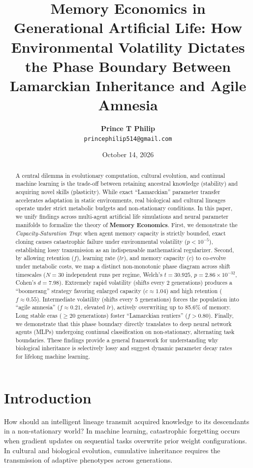 \documentclass[11pt,a4paper]{article}
\title{\textbf{Memory Economics in Generational Artificial Life: How Environmental Volatility Dictates the Phase Boundary Between Lamarckian Inheritance and Agile Amnesia}}
\author{\textbf{Prince T Philip} \\ \texttt{princephilip514@gmail.com}}
\date{October 14, 2026}
\begin{document}
\maketitle

\begin{abstract}
A central dilemma in evolutionary computation, cultural evolution, and continual machine learning is the trade-off between retaining ancestral knowledge (stability) and acquiring novel skills (plasticity). While exact ``Lamarckian'' parameter transfer accelerates adaptation in static environments, real biological and cultural lineages operate under strict metabolic budgets and non-stationary conditions. In this paper, we unify findings across multi-agent artificial life simulations and neural parameter manifolds to formalize the theory of \textbf{Memory Economics}. First, we demonstrate the \textit{Capacity-Saturation Trap}: when agent memory capacity is strictly bounded, exact cloning causes catastrophic failure under environmental volatility ($p < 10^{-5}$), establishing lossy transmission as an indispensable mathematical regularizer. Second, by allowing retention ($f$), learning rate ($lr$), and memory capacity ($c$) to co-evolve under metabolic costs, we map a distinct non-monotonic phase diagram across shift timescales ($N=30$ independent runs per regime, Welch's $t = 30.925$, $p = 2.86 \times 10^{-32}$, Cohen's $d = 7.98$). Extremely rapid volatility (shifts every 2 generations) produces a ``boomerang'' strategy favoring enlarged capacity ($c \approx 1.04$) and high retention ($f \approx 0.55$). Intermediate volatility (shifts every 5 generations) forces the population into ``agile amnesia'' ($f \approx 0.21$, elevated $lr$), actively overwriting up to 85.6\% of memory. Long stable eras ($\ge 20$ generations) foster ``Lamarckian rentiers'' ($f > 0.80$). Finally, we demonstrate that this phase boundary directly translates to deep neural network agents (MLPs) undergoing continual classification on non-stationary, alternating task boundaries. These findings provide a general framework for understanding why biological inheritance is selectively lossy and suggest dynamic parameter decay rates for lifelong machine learning.
\end{abstract}

\section{Introduction}
How should an intelligent lineage transmit acquired knowledge to its descendants in a non-stationary world? In machine learning, catastrophic forgetting occurs when gradient updates on sequential tasks overwrite prior weight configurations. In cultural and biological evolution, cumulative inheritance requires the transmission of adaptive phenotypes across generations. 
\end{document}
